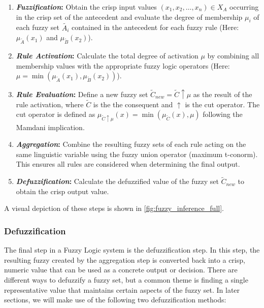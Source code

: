 \begin{enumerate}
      \item \textbf{\emph{Fuzzification}:} Obtain the crisp input values $(x_1, x_2, \ldots, x_n) \in X_{A}$ occurring in the crisp set of the antecedent and evaluate the degree of membership $\mu_i$ of each fuzzy set $\tilde{A_i}$ contained in the antecedent for each fuzzy rule (Here: $\mu_{\tilde{A}}(x_1)$ and $\mu_{\tilde{B}}(x_2)$).
      \item \textbf{\emph{Rule Activation}:} Calculate the total degree of activation $\mu$ by combining all membership values with the appropriate fuzzy logic operators (Here: $\mu = \min(\mu_{\tilde{A}}(x_1), \mu_{\tilde{B}}(x_2))$).
      \item \textbf{\emph{Rule Evaluation}:} Define a new fuzzy set $\tilde{C}_{new}=\tilde{C}\uparrow \mu$ as the result of the rule activation, where $\tilde{C}$ is the the consequent and $\uparrow$ is the cut operator. The cut operator is defined as $\mu_{\tilde{C}\uparrow \mu}(x) = \min(\mu_{\tilde{C}}(x), \mu)$ following the Mamdani implication.
      \item \textbf{\emph{Aggregation}:}  Combine the resulting fuzzy sets of each rule acting on the same linguistic variable using the fuzzy union operator (maximum t-conorm). This ensures all rules are considered when determining the final output.
      \item \textbf{\emph{Defuzzification}:} Calculate the defuzzified value of the fuzzy set $\tilde{C}_{new}$ to obtain the crisp output value.
\end{enumerate}

A visual depiction of these steps is shown in \autoref{fig:fuzzy_inference_full}.

\subsubsection{Defuzzification}

The final step in a Fuzzy Logic system is the defuzzification step. In this step, the resulting fuzzy created by the aggregation step is converted back into a crisp, numeric value that can be used as a concrete output or decision. There are different ways to defuzzify a fuzzy set, but a common theme is finding a single representative value that maintains certain aspects of the fuzzy set. In later sections, we will make use of the following two defuzzification methods:

